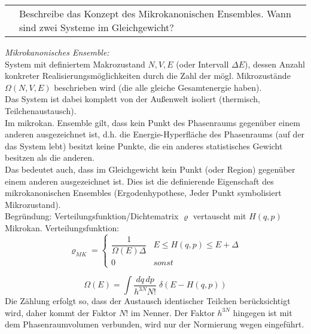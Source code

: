 \documentclass[a4paper,12pt]{scrartcl}
\makeatletter
\newcounter{qc}\setcounter{qc}{1}
\newenvironment{fshaded}{
\def\FrameCommand{\fcolorbox{framecolor}{shadecolor}}
\MakeFramed {\FrameRestore}}
{\endMakeFramed}
\def\frage#1{
\begin{fshaded}
\noindent
\begin{tabularx}{0.99\textwidth}{@{}c!{\color{framecolor}\vline}X}
{ \bf \rm \theqc }	&	\noindent #1
\end{tabularx}
\stepcounter{qc}
\end{fshaded}
}
\makeatother
\begin{document}
\frage{Beschreibe das Konzept des Mikrokanonischen Ensembles. Wann sind zwei Systeme im Gleichgewicht?}
\noindent
\textit{Mikrokanonisches Ensemble:}\\
System mit definiertem Makrozustand $N,V,E$ (oder Intervall $\Delta E$), dessen Anzahl konkreter Realisierungsmöglichkeiten 
durch die Zahl der mögl. Mikrozustände $\Omega(N,V,E)$ beschrieben wird (die alle gleiche Gesamtenergie haben).\\
Das System ist dabei komplett von der Außenwelt isoliert (thermisch, Teilchenaustausch).\\
Im mikrokan. Ensemble gilt, dass kein Punkt des Phasenraums gegenüber einem anderen ausgezeichnet ist, d.h. die 
Energie-Hyperfläche des Phasenraums (auf der das System lebt) besitzt keine Punkte, die ein anderes statistisches Gewicht 
besitzen als die anderen.\\
Das bedeutet auch, dass im Gleichgewicht kein Punkt (oder Region) gegenüber einem anderen ausgezeichnet ist. Dies ist die 
definierende Eigenschaft des mikrokanonischen Ensembles (Ergodenhypothese, Jeder Punkt symbolisiert Mikrozustand).\\
Begründung: Verteilungsfunktion/Dichtematrix $\varrho$ vertauscht mit $H(q,p)$\\
Mikrokan. Verteilungsfunktion:\\
\[\varrho_{MK}=\left\{ 
\begin{array}{*{2}{l}}
  \dfrac{1}{\Omega(E)\Delta} & E \leq H(q,p) \leq E+\Delta\\
  0 & sonst
\end{array}
\right.\]

\[\Omega(E)=\int \frac{dq\,dp}{h^{3N}N!}\;\delta(E-H(q,p))\]
Die Zählung erfolgt so, dass der Austausch identischer Teilchen berücksichtigt wird, daher kommt der Faktor $N!$ im Nenner. Der Faktor $h^{3N}$ hingegen ist mit dem Phasenraumvolumen verbunden, wird nur der Normierung wegen eingeführt. 

\end{document}
